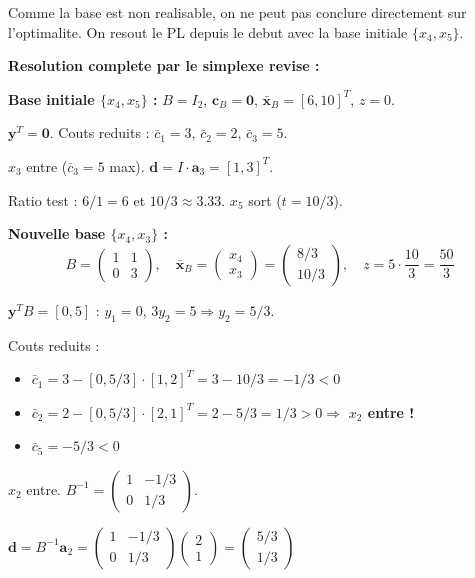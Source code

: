 \documentclass[12pt,a4paper]{article}
\begin{document}
\begin{correction}
Comme la base est non realisable, on ne peut pas conclure directement sur l'optimalite. On resout le PL depuis le debut avec la base initiale $\{x_4, x_5\}$.

\textbf{Resolution complete par le simplexe revise :}

\textbf{Base initiale $\{x_4, x_5\}$ :} $B = I_2$, $\mathbf{c}_B = \mathbf{0}$, $\bar{\mathbf{x}}_B = [6, 10]^T$, $z = 0$.

$\mathbf{y}^T = \mathbf{0}$. Couts reduits : $\bar{c}_1 = 3$, $\bar{c}_2 = 2$, $\bar{c}_3 = 5$.

$x_3$ entre ($\bar{c}_3 = 5$ max). $\mathbf{d} = I\cdot\mathbf{a}_3 = [1,3]^T$.

Ratio test : $6/1 = 6$ et $10/3 \approx 3.33$. $x_5$ sort ($t = 10/3$).

\textbf{Nouvelle base $\{x_4, x_3\}$ :}
$$B = \begin{pmatrix}1 & 1\\0 & 3\end{pmatrix},\quad
\bar{\mathbf{x}}_B = \begin{pmatrix}x_4\\x_3\end{pmatrix} = \begin{pmatrix}8/3\\10/3\end{pmatrix}, \quad z = 5 \cdot \frac{10}{3} = \frac{50}{3}$$

$\mathbf{y}^T B = [0,5]$ : $y_1 = 0$, $3y_2 = 5 \Rightarrow y_2 = 5/3$.

Couts reduits :
\begin{itemize}
\item $\bar{c}_1 = 3 - [0, 5/3]\cdot[1,2]^T = 3 - 10/3 = -1/3 < 0$
\item $\bar{c}_2 = 2 - [0, 5/3]\cdot[2,1]^T = 2 - 5/3 = 1/3 > 0 \Rightarrow$ \textcolor{defvert}{\textbf{$x_2$ entre !}}
\item $\bar{c}_5 = -5/3 < 0$
\end{itemize}

$x_2$ entre. $B^{-1} = \begin{pmatrix}1 & -1/3\\0 & 1/3\end{pmatrix}$.

$\mathbf{d} = B^{-1}\mathbf{a}_2 = \begin{pmatrix}1 & -1/3\\0 & 1/3\end{pmatrix}\begin{pmatrix}2\\1\end{pmatrix} = \begin{pmatrix}5/3\\1/3\end{pmatrix}$


\end{correction}
\end{document}
